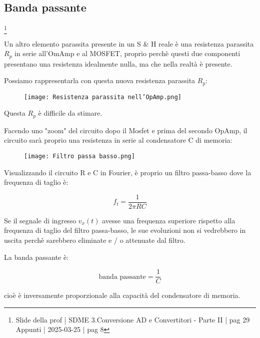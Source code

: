 \subsection{Banda passante} 
\footnote{Slide della prof | SDME 3.Conversione AD e Convertitori - Parte II | pag 29 \\  
Appunti | 2025-03-25 | pag 8} 

Un altro elemento parassita presente in un S \& H reale è una resistenza parassita $R_p$ in serie all'OmAmp e al MOSFET, 
proprio perchè questi due componenti presentano una resistenza idealmente nulla, ma che nella realtà è presente. \newline 

Possiamo rappresentarla con questa nuova resistenza parassita $R_p$: 

\begin{figure}[h]
    \centering
    \texttt{[image: Resistenza parassita nell'OpAmp.png]}
\end{figure}

Questa $R_p$ è difficile da stimare. \newline 

Facendo uno "zoom" del circuito dopo il Mosfet e prima del secondo OpAmp, 
il circuito sarà proprio una resistenza in serie al condensatore C di memoria: 

\begin{figure}[h]
    \centering
    \texttt{[image: Filtro passa basso.png]}
\end{figure}

Visualizzando il circuito R e C in Fourier, è proprio un filtro passa-basso dove la frequenza di taglio è: 

{
    \Large 
    \begin{equation}
        f_t = \frac{1}{2 \pi RC}
    \end{equation}
}

Se il segnale di ingresso $v_x (t)$ avesse una frequenza superiore rispetto alla frequenza di taglio del filtro passa-basso, 
le sue evoluzioni non si vedrebbero in uscita perchè sarebbero eliminate e / o attenuate dal filtro. \newline 

La banda passante è: 

{
    \Large 
    \begin{equation}
        \text{banda passante} = \frac{1}{C}
    \end{equation}
}

cioè è inversamente proporzionale alla capacità del condensatore di memoria. \newline 


